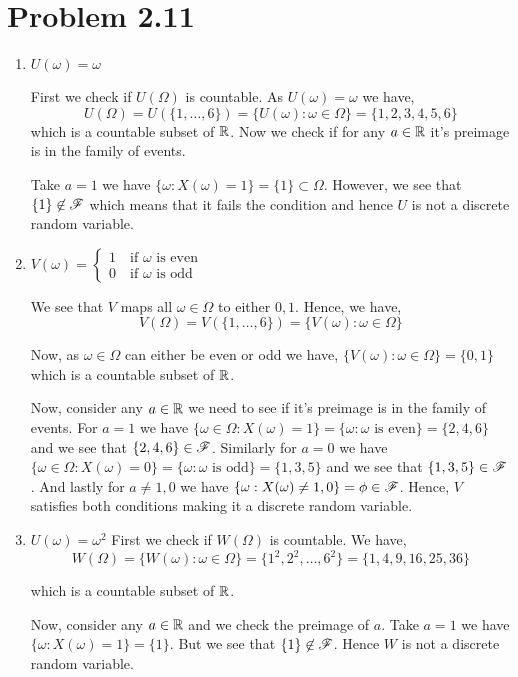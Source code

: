 \documentclass[a4paper]{report}
\begin{document}
\section*{Problem 2.11}
\begin{enumerate}
	\item $U(\omega) = \omega$
	
	First we check if $U(\Omega)$ is countable. As  $U(\omega) = \omega$ we have, 
	$$ U(\Omega) = U(\{1, \dots, 6\} )  = \{U(\omega): \omega \in \Omega\} =  \{1, 2, 3, 4, 5, 6\} $$ 
	which is a countable subset of $\mathbb{R}$. Now we check if for any $a \in \mathbb{R}$ it's preimage is in the family of events.

	\vspace{1em}
	
	 Take $a = 1$ we have  $\{\omega: X(\omega) = 1\} = \{1\} \subset \Omega $. However, we see that $\{1\} \not \in \mathscr{F}$ which means that it fails the condition and hence $U$ is not a discrete random variable.

	\item $V(\omega) = \begin{cases}1 \quad \text{if $\omega$ is even}\\0 \quad \text{if $\omega$ is odd}  \end{cases}$

	We see that $V$ maps all $\omega \in \Omega$ to either  $0, 1$. Hence, we have,  
	$$ V(\Omega) = V(\{1, \dots, 6\} ) = \{V(\omega) : \omega \in \Omega\}  $$ 

	Now, as $\omega \in \Omega$ can either be even or odd we have,  $\{V(\omega) : \omega \in \Omega\} = \{0, 1\}$ which is a countable subset of $\mathbb{R}$.

	\vspace{1em}
	
	Now, consider any $a \in \mathbb{R}$ we need to see if it's preimage  is in the family of events. For $a = 1$ we have  $\{\omega \in \Omega: X(\omega) = 1\} = \{\omega: \omega \text{ is even} \} = \{2,4,6\}$ and we see that $\{2,4,6\} \in \mathscr{F} $. Similarly for $a = 0$ we have  $\{\omega \in \Omega: X(\omega) = 0\} = \{\omega: \omega \text{ is odd} \} = \{1,3,5\}$ and we see that $\{1,3,5\} \in \mathscr{F}$. And lastly for $a \ne 1,0$ we have $\{\omega: X(\omega) \ne 1, 0\} = \phi \in \mathscr{F}$. Hence, $V$ satisfies both conditions making it a discrete random variable.
	
	\item $U(\omega) = \omega^2$
		First we check if $W(\Omega)$ is countable. We have,  
		$$ W(\Omega) = \{W(\omega): \omega \in \Omega\} = \{1^2, 2^2, \dots, 6^2\} = \{1, 4, 9, 16, 25, 36\}    $$ 

		which is a countable subset of $\mathbb{R}$.

		\vspace{1em}
		
		Now, consider any $a \in \mathbb{R}$ and we check the preimage of  $a$. Take $a = 1$ we have  $\{\omega: X(\omega) = 1\} = \{1\} $. But we see that $\{1\} \not \in \mathscr{F} $. Hence $W$ is not a discrete random variable.

	
\end{enumerate}
\end{document}
